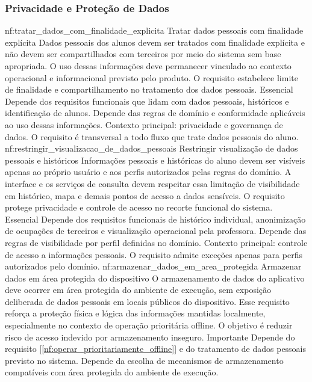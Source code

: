 \subsubsection*{Privacidade e Proteção de Dados}
\reqfuncfull
{nf:tratar_dados_com_finalidade_explicita}
{Tratar dados pessoais com finalidade explícita}
{Dados pessoais dos alunos devem ser tratados com finalidade explícita e não devem ser compartilhados com terceiros por meio do sistema sem base apropriada. O uso dessas informações deve permanecer vinculado ao contexto operacional e informacional previsto pelo produto. O requisito estabelece limite de finalidade e compartilhamento no tratamento dos dados pessoais.}
{Essencial}
{Depende dos requisitos funcionais que lidam com dados pessoais, históricos e identificação de alunos. Depende das regras de domínio e conformidade aplicáveis ao uso dessas informações.}
{Contexto principal: privacidade e governança de dados. O requisito é transversal a todo fluxo que trate dados pessoais do aluno.}
\reqfuncfull
{nf:restringir_visualizacao_de_dados_pessoais}
{Restringir visualização de dados pessoais e históricos}
{Informações pessoais e históricas do aluno devem ser visíveis apenas ao próprio usuário e aos perfis autorizados pelas regras do domínio. A interface e os serviços de consulta devem respeitar essa limitação de visibilidade em histórico, mapa e demais pontos de acesso a dados sensíveis. O requisito protege privacidade e controle de acesso no recorte funcional do sistema.}
{Essencial}
{Depende dos requisitos funcionais de histórico individual, anonimização de ocupações de terceiros e visualização operacional pela professora. Depende das regras de visibilidade por perfil definidas no domínio.}
{Contexto principal: controle de acesso a informações pessoais. O requisito admite exceções apenas para perfis autorizados pelo domínio.}
\reqfuncfull
{nf:armazenar_dados_em_area_protegida}
{Armazenar dados em área protegida do dispositivo}
{O armazenamento de dados do aplicativo deve ocorrer em área protegida do ambiente de execução, sem exposição deliberada de dados pessoais em locais públicos do dispositivo. Esse requisito reforça a proteção física e lógica das informações mantidas localmente, especialmente no contexto de operação prioritária offline. O objetivo é reduzir risco de acesso indevido por armazenamento inseguro.}
{Importante}
{Depende do requisito [\ref{nf:operar_prioritariamente_offline}] e do tratamento de dados pessoais previsto no sistema. Depende da escolha de mecanismos de armazenamento compatíveis com área protegida do ambiente de execução.}
